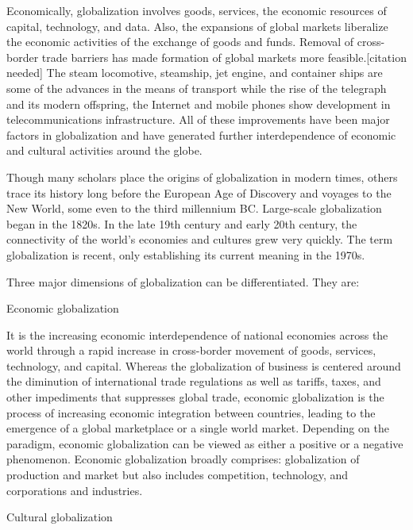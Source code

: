 \documentclass[
  openany]{book}
\begin{document}
Economically, globalization involves goods, services, the economic resources of capital, technology, and data. Also, the expansions of global markets liberalize the economic activities of the exchange of goods and funds. Removal of cross-border trade barriers has made formation of global markets more feasible.{[}citation needed{]} The steam locomotive, steamship, jet engine, and container ships are some of the advances in the means of transport while the rise of the telegraph and its modern offspring, the Internet and mobile phones show development in telecommunications infrastructure. All of these improvements have been major factors in globalization and have generated further interdependence of economic and cultural activities around the globe.

Though many scholars place the origins of globalization in modern times, others trace its history long before the European Age of Discovery and voyages to the New World, some even to the third millennium BC. Large-scale globalization began in the 1820s. In the late 19th century and early 20th century, the connectivity of the world's economies and cultures grew very quickly. The term globalization is recent, only establishing its current meaning in the 1970s.

Three major dimensions of globalization can be differentiated. They are:

Economic globalization

It is the increasing economic interdependence of national economies across the world through a rapid increase in cross-border movement of goods, services, technology, and capital. Whereas the globalization of business is centered around the diminution of international trade regulations as well as tariffs, taxes, and other impediments that suppresses global trade, economic globalization is the process of increasing economic integration between countries, leading to the emergence of a global marketplace or a single world market. Depending on the paradigm, economic globalization can be viewed as either a positive or a negative phenomenon. Economic globalization broadly comprises: globalization of production and market but also includes competition, technology, and corporations and industries.

Cultural globalization
\end{document}
